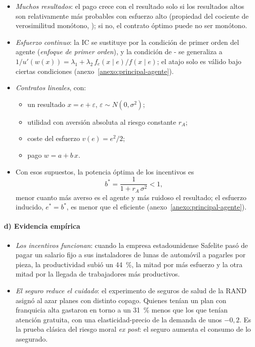 \documentclass[11pt]{article}
\begin{document}
\begin{itemize}
\item \emph{Muchos resultados}: el pago crece con el resultado solo si los resultados altos son relativamente más probables con esfuerzo alto (propiedad del cociente de verosimilitud monótono, \textcite{Milgrom1981Good}); si no, el contrato óptimo puede no ser monótono\nocite{GrossmanHart1983Analysis}.
\item \emph{Esfuerzo continuo}: la IC se sustituye por la condición de primer orden del agente (\emph{enfoque de primer orden}), y la condición de - se generaliza a $1/u'(w(x))=\lambda_1+\lambda_2\,f_e(x\mid e)/f(x\mid e)$; el atajo solo es válido bajo ciertas condiciones\nocite{Rogerson1985FirstOrder} (anexo~\ref{anexo:principal-agente}).
\item \emph{Contratos lineales}\nocite{HolmstromMilgrom1987Aggregation}, con:
  \begin{itemize}
  \item un resultado $x=e+\varepsilon$, $\varepsilon\sim N(0,\sigma^2)$;
  \item utilidad con aversión absoluta al riesgo constante $r_A$;
  \item coste del esfuerzo $v(e)=e^2/2$;
  \item pago $w=a+b\,x$.
  \end{itemize}
\item Con esos supuestos, la potencia óptima de los incentivos es
  \begin{equation}
  b^*=\frac{1}{1+r_A\,\sigma^2}<1, \label{eq:contrato-lineal}
  \end{equation}
  menor cuanto más averso es el agente y más ruidoso el resultado; el esfuerzo inducido, $e^*=b^*$, es menor que el eficiente (anexo~\ref{anexo:principal-agente}).
\end{itemize}

\paragraph{d) Evidencia empírica}

\begin{itemize}
\item \emph{Los incentivos funcionan}: cuando la empresa estadounidense Safelite pasó de pagar un salario fijo a sus instaladores de lunas de automóvil a pagarles por pieza, la productividad subió un 44~\%, la mitad por más esfuerzo y la otra mitad por la llegada de trabajadores más productivos\nocite{Lazear2000Performance}.
\item \emph{El seguro reduce el cuidado}: el experimento de seguros de salud de la RAND asignó al azar planes con distinto copago. Quienes tenían un plan con franquicia alta gastaron en torno a un 31~\% menos que los que tenían atención gratuita, con una elasticidad-precio de la demanda de unos $-0{,}2$\nocite{Manning1987Health,AronDineEinavFinkelstein2013RAND}. Es la prueba clásica del riesgo moral \emph{ex post}: el seguro aumenta el consumo de lo asegurado.
\end{itemize}
\end{document}
